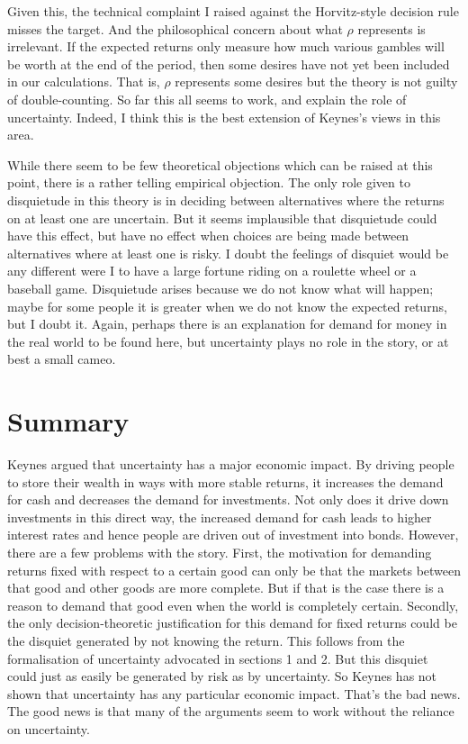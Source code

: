 Given this, the technical complaint I raised against the Horvitz-style decision rule misses the target. And the philosophical concern about what \(\rho\) represents is irrelevant. If the expected returns only measure how much various gambles will be worth at the end of the period, then some desires have not yet been included in our calculations. That is, \(\rho\) represents some desires but the theory is not guilty of double-counting. So far this all seems to work, and explain the role of uncertainty. Indeed, I think this is the best extension of Keynes's views in this area.

While there seem to be few theoretical objections which can be raised at this point, there is a rather telling empirical objection. The only role given to disquietude in this theory is in deciding between alternatives where the returns on at least one are uncertain. But it seems implausible that disquietude could have this effect, but have no effect when choices are being made between alternatives where at least one is risky. I doubt the feelings of disquiet would be any different were I to have a large fortune riding on a roulette wheel or a baseball game. Disquietude arises because we do not know what will happen; maybe for some people it is greater when we do not know the expected returns, but I doubt it. Again, perhaps there is an explanation for demand for money in the real world to be found here, but uncertainty plays no role in the story, or at best a small cameo.

\section{Summary}
Keynes argued that uncertainty has a major economic impact. By driving people to store their wealth in ways with more stable returns, it increases the demand for cash and decreases the demand for investments. Not only does it drive down investments in this direct way, the increased demand for cash leads to higher interest rates and hence people are driven out of investment into bonds. However, there are a few problems with the story. First, the motivation for demanding returns fixed with respect to a certain good can only be that the markets between that good and other goods are more complete. But if that is the case there is a reason to demand that good even when the world is completely certain. Secondly, the only decision-theoretic justification for this demand for fixed returns could be the disquiet generated by not knowing the return. This follows from the formalisation of uncertainty advocated in sections 1 and 2. But this disquiet could just as easily be generated by risk as by uncertainty. So Keynes has not shown that uncertainty has any particular economic impact. That's the bad news. The good news is that many of the arguments seem to work without the reliance on uncertainty. 

